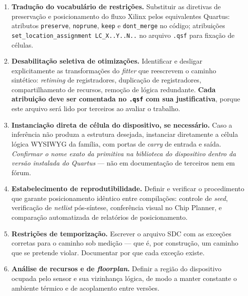 \documentclass[11pt,a4paper]{article}
\newcommand{\campo}[1]{\vspace{6pt}\noindent{\bfseries\color{lescgray}#1}\par\vspace{2pt}}
\begin{document}
\campo{Tarefas}
\begin{enumerate}
  \item \textbf{Tradução do vocabulário de restrições.}
        Substituir as diretivas de preservação e posicionamento do fluxo Xilinx pelos
        equivalentes Quartus: atributos \texttt{preserve}, \texttt{noprune},
        \texttt{keep} e \texttt{dont\_merge} no código; atribuições
        \texttt{set\_location\_assignment LC\_X..Y..N..} no arquivo \texttt{.qsf} para
        fixação de células.

  \item \textbf{Desabilitação seletiva de otimizações.}
        Identificar e desligar explicitamente as transformações do \emph{fitter} que
        reescrevem o caminho sintético: \emph{retiming} de registradores, duplicação
        de registradores, compartilhamento de recursos, remoção de lógica redundante.
        \textbf{Cada atribuição deve ser comentada no \texttt{.qsf} com sua justificativa},
        porque este arquivo será lido por terceiros ao avaliar o trabalho.

  \item \textbf{Instanciação direta de célula do dispositivo, se necessário.}
        Caso a inferência não produza a estrutura desejada, instanciar diretamente a
        célula lógica WYSIWYG da família, com portas de \emph{carry} de entrada e saída.
        \emph{Confirmar o nome exato da primitiva na biblioteca do dispositivo dentro da
        versão instalada do Quartus} --- não em documentação de terceiros nem em fórum.

  \item \textbf{Estabelecimento de reprodutibilidade.}
        Definir e verificar o procedimento que garante posicionamento idêntico entre
        compilações: controle de \emph{seed}, verificação de \emph{netlist} pós-síntese,
        conferência visual no Chip Planner, e comparação automatizada de relatórios
        de posicionamento.

  \item \textbf{Restrições de temporização.}
        Escrever o arquivo SDC com as exceções corretas para o caminho sob medição ---
        que é, por construção, um caminho que se pretende violar. Documentar por que
        cada exceção existe.

  \item \textbf{Análise de recursos e de \emph{floorplan}.}
        Definir a região do dispositivo ocupada pelo sensor e sua vizinhança lógica,
        de modo a manter constante o ambiente térmico e de acoplamento entre versões.
\end{enumerate}
\end{document}
